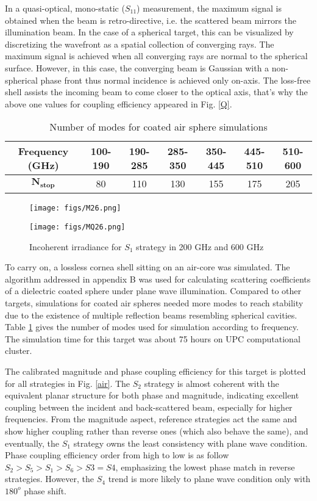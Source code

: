 \documentclass{osa-article}
\begin{document}
In a quasi-optical, mono-static ($S_{11}$) measurement, the maximum signal is obtained when the beam is retro-directive, i.e. the scattered beam mirrors the illumination beam. In the case of a spherical target, this can be visualized by discretizing the wavefront as a spatial collection of converging rays. The maximum signal is achieved when all converging rays are normal to the spherical surface. However, in this case, the converging beam is Gaussian with a non-spherical phase front thus normal incidence is achieved only on-axis. The loss-free shell assists the incoming beam to come closer to the optical axis, that's why the above one values for coupling efficiency appeared in Fig. \ref{Q}.
\begin{table}[ht]
\centering
\caption{Number of modes for coated air sphere simulations}\label{t2}
\begin{tabular}{ c | c  c  c  c  c  c }
\hline
\textbf{Frequency (GHz)} & 100-190  & 190-285 & 285-350 & 350-445 & 445-510 & 510-600 \\ 
\hline
$\mathbf{N_{stop}}$ & 80 & 110 & 130 & 155 & 175 & 205 \\ [0.5ex] 
\hline
\end{tabular}
\end{table}
\begin{figure}[ht]
\centering
\texttt{[image: figs/M26.png]}
\vspace*{-1 mm}

\texttt{[image: figs/MQ26.png]}
\caption{Incoherent irradiance for $S_1$ strategy in 200 GHz and 600 GHz}\label{MQ}
\end{figure}

To carry on, a lossless cornea shell sitting on an air-core was simulated. The algorithm addressed in appendix B was used for calculating scattering coefficients of a dielectric coated sphere under plane wave illumination. Compared to other targets, simulations for coated air spheres needed more modes to reach stability due to the existence of multiple reflection beams resembling spherical cavities. Table \ref{t2} gives the number of modes used for simulation according to frequency. The simulation time for this target was about 75 hours on UPC computational cluster.

The calibrated magnitude and phase coupling efficiency for this target is plotted for all strategies in Fig. \ref{air}. The $S_2$ strategy is almost coherent with the equivalent planar structure for both phase and magnitude, indicating excellent coupling between the incident and back-scattered beam, especially for higher frequencies. From the magnitude aspect, reference strategies act the same and show higher coupling rather than reverse ones (which also behave the same), and eventually, the $S_1$ strategy owns the least consistency with plane wave condition. Phase coupling efficiency order from high to low is as follow $S_2>S_5>S_1>S_6>S3=S4$, emphasizing the lowest phase match in reverse strategies. However, the $S_4$ trend is more likely to plane wave condition only with $180^o$ phase shift.
\end{document}
